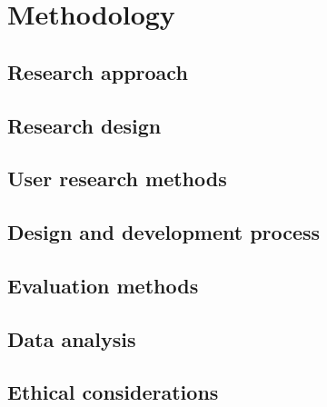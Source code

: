 \chapter{Methodology}
\label{chap:methodology}

\section{Research approach}
\label{sec:method-approach}

\section{Research design}
\label{sec:method-design}

\section{User research methods}
\label{sec:method-user}

\section{Design and development process}
\label{sec:method-development}

\section{Evaluation methods}
\label{sec:method-evaluation}

\section{Data analysis}
\label{sec:method-analysis}

\section{Ethical considerations}
\label{sec:method-ethics}
